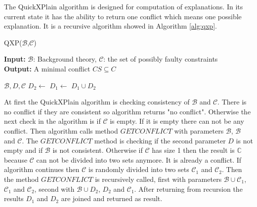 \documentclass[12pt,a4paper]{article}
\begin{document}
The QuickXPlain algorithm is designed for computation of explanations. In its current state it has the ability to return one conflict which means one possible explanation. It is a recursive algorithm showed in Algorithm \ref{alg:qxp}.

\begin{algorithm}[H]
	\footnotesize
	\caption{QXP($\mathcal{B}$,$\mathcal{C}$)}
	\label{alg:qxp}
	\textbf{Input:} $\mathcal{B}$: Background theory, $\mathcal{C}$: the set of possibly faulty constraints  \\
	\textbf{Output:} A minimal conflict $CS \subseteq C$
	\begin{algorithmic}[1]
		\State {}
		\State \Return {$\emptyset$}
		\EndIf
		\State {}
		
		\medskip
		 {$\mathcal{B}, D, \mathcal{C}$}
		\State \Return {$\emptyset$}
		\EndIf
		\State {}
		\EndIf
		\State $D_{2} \gets$ 
		\State $D_{1} \gets$ 
		\State \Return $D_{1} \cup D_{2}$
		\EndFunction			
	\end{algorithmic}
\end{algorithm}

At first the QuickXPlain algorithm is checking consistency of $\mathcal{B}$ and $\mathcal{C}$. There is no conflict if they are consistent so algorithm returns "no conflict". Otherwise the next check in the algorithm is if $\mathcal{C}$ is empty. If it is empty there can not be any conflict. Then algorithm calls method $\mathit{GETCONFLICT}$ with parameters $\mathcal{B}$, $\mathcal{B}$ and $\mathcal{C}$. The $\mathit{GETCONFLICT}$ method is checking if the second parameter $D$ is not empty and if $\mathcal{B}$ is not consistent. Otherwise if $\mathcal{C}$ has size 1 then the result is $\mathbb{C}$ because $\mathcal{C}$ can not be divided into two sets anymore. It is already a conflict. If algorithm continues then $\mathcal{C}$ is randomly divided into two sets $\mathcal{C}_{1}$ and $\mathcal{C}_{2}$. Then the method $\mathit{GETCONFLICT}$ is recursively called, first with parameters $\mathcal{B} \cup \mathcal{C}_{1}$, $\mathcal{C}_{1}$ and $\mathcal{C_{2}}$, second with $\mathcal{B} \cup D_{2}$, $D_{2}$ and $\mathcal{C}_{1}$. After returning from recursion the results $D_{1}$ and $D_{2}$ are joined and returned as result.
\end{document}
